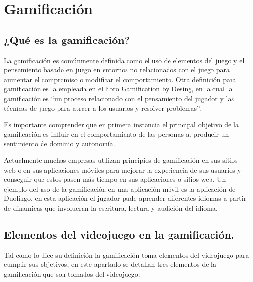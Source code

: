 \section{Gamificación}

\subsection{¿Qué es la gamificación?}
La gamificación es comúnmente definida como el uso de elementos del juego y el 
pensamiento basado en juego en entornos no relacionados con el juego para aumentar 
el compromiso o modificar el comportamiento\cite{RefIntroGamificacion}. Otra 
definición para gamificación es la empleada en el libro Gamification by Desing, 
en la cual la gamificación es “un  proceso 
relacionado con el pensamiento del jugador y las técnicas de juego para atraer 
a los usuarios y resolver problemas”\cite{zichermann2011gamification}. 
\\
\par
Es importante comprender que en primera instancia el principal objetivo de la 
gamificación es influir en el comportamiento de las personas al producir un 
sentimiento de dominio y autonomía.  
\\
\par
Actualmente muchas empresas utilizan principios de gamificación en sus sitios 
web o en sus aplicaciones móviles para mejorar la experiencia de sus usuarios y 
conseguir que estos pasen más tiempo en sus aplicaciones o sitios web. Un 
ejemplo del uso de la gamificación en una aplicación móvil es la aplicación de 
Duolingo, en esta aplicación el jugador pude aprender diferentes idiomas a partir 
de dinamicas que involucran la escritura, lectura y audición del idioma. 

\subsection{Elementos del videojuego en la gamificación.}
 Tal como lo dice su definición la gamificación toma elementos del videojuego 
 para cumplir sus objetivos, en este apartado se detallan tres elementos de 
 la gamificación que son tomados del videojuego:

